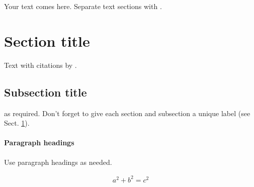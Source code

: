 \documentclass[smallextended]{svjour3}       %
\begin{document}
Your text comes here. Separate text sections with \cite{Mislevy06Cog}.

\hypertarget{sec:1}{%
\section{Section title}\label{sec:1}}

Text with citations by \cite{Galyardt14mmm}.

\hypertarget{sec:2}{%
\subsection{Subsection title}\label{sec:2}}

as required. Don't forget to give each section and subsection a unique
label (see Sect. \ref{sec:1}).

\hypertarget{paragraph-headings}{%
\paragraph{Paragraph headings}\label{paragraph-headings}}

Use paragraph headings as needed.

\begin{align}
a^2+b^2=c^2
\end{align}



\end{document}
